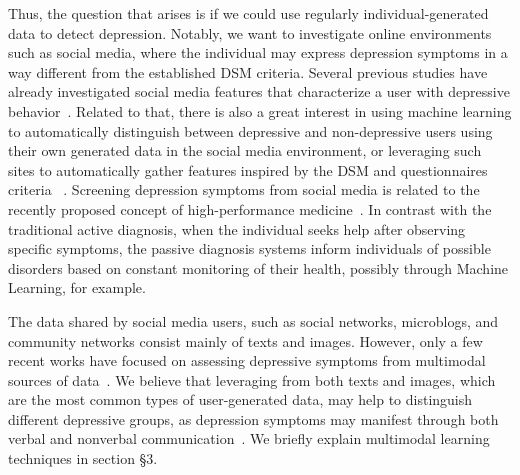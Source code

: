 \documentclass[letterpaper]{article} \usepackage{aaai20}  \usepackage{times}  \usepackage{helvet} \usepackage{courier}  \usepackage[hyphens]{url}  \usepackage{graphicx} \urlstyle{rm} \def\UrlFont{\rm}  \usepackage{graphicx}  \frenchspacing  \setlength{\pdfpagewidth}{8.5in}  \setlength{\pdfpageheight}{11in}  \usepackage[final]{changes}
\begin{document}
Thus, the question that arises is if we could use regularly individual-generated data to detect depression. Notably, we want to investigate online environments such as social media, where the individual may express depression symptoms in a way different from the established DSM criteria. Several previous studies have already investigated social media features that characterize a user with depressive behavior~\cite{shen2017depression,sErnalaLBBRKC18,naslund2019exploring,jeri2019association}. Related to that, there is also a great interest in using machine learning to automatically distinguish between depressive and non-depressive users using their own generated data in the social media environment, or leveraging such sites to automatically gather features inspired by the DSM and questionnaires criteria~\cite{de2013predicting,tsugawa2015recognizing,reece2017instagram,shen2017depression} .  Screening depression symptoms from social media is related to the recently proposed concept of high-performance medicine~\cite{topol2019high}. In contrast with the traditional active diagnosis, when the individual seeks help after observing specific symptoms, the passive diagnosis systems inform individuals of possible disorders based on constant monitoring of their health, possibly through Machine Learning, for example.

The data shared by social media users, such as social networks, microblogs, and community networks consist mainly of texts and images. However, only a few recent works have focused on assessing depressive symptoms from multimodal sources of data~\cite{morales2018linguistically}. We believe that leveraging from both texts and images, which are the most common types of user-generated data, may help to distinguish different depressive groups, as depression symptoms may manifest through both verbal and nonverbal communication~\cite{morales-etal-2017-cross}. We briefly explain multimodal learning techniques in section \S 3. 
\end{document}
